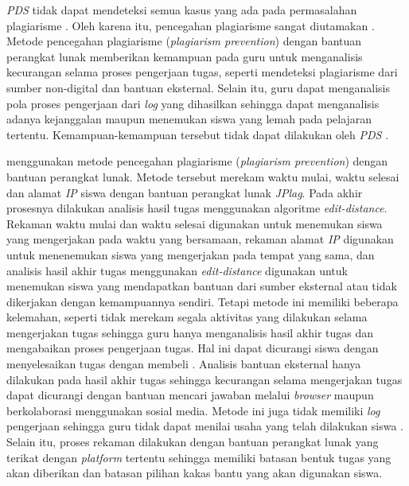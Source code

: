 \emph{PDS} tidak dapat mendeteksi semua kasus yang ada pada
permasalahan plagiarisme \parencite{martins2014plagiarism}. Oleh karena
itu, pencegahan plagiarisme sangat diutamakan
\parencite{garner2012stop}. Metode pencegahan plagiarisme
(\emph{plagiarism prevention}) dengan bantuan perangkat lunak
memberikan kemampuan pada guru untuk menganalisis kecurangan selama
proses pengerjaan tugas, seperti mendeteksi plagiarisme dari sumber
non-digital dan bantuan eksternal. Selain itu, guru dapat menganalisis
pola proses pengerjaan dari \emph{log} yang dihasilkan sehingga dapat
menganalisis adanya kejanggalan maupun menemukan siswa yang lemah pada
pelajaran tertentu. Kemampuan-kemampuan tersebut tidak dapat dilakukan oleh
\emph{PDS} \parencite{hellas2017plagiarism}.

\textcite{hellas2017plagiarism} menggunakan metode pencegahan
plagiarisme (\emph{plagiarism prevention}) dengan bantuan perangkat
lunak. Metode tersebut merekam waktu mulai, waktu selesai dan alamat
\emph{IP} siswa dengan bantuan perangkat lunak \emph{JPlag}. Pada
akhir prosesnya dilakukan analisis hasil tugas menggunakan algoritme
\emph{edit-distance}. Rekaman waktu mulai dan waktu selesai digunakan
untuk menemukan siswa yang mengerjakan pada waktu yang bersamaan,
rekaman alamat \emph{IP} digunakan untuk menenemukan siswa yang
mengerjakan pada tempat yang sama, dan analisis hasil akhir tugas
menggunakan \emph{edit-distance} digunakan untuk menemukan siswa yang
mendapatkan bantuan dari sumber eksternal atau tidak dikerjakan dengan
kemampuannya sendiri. Tetapi metode ini memiliki beberapa kelemahan,
seperti tidak merekam segala aktivitas yang dilakukan selama
mengerjakan tugas sehingga guru hanya menganalisis hasil akhir tugas
dan mengabaikan proses pengerjaan tugas. Hal ini dapat dicurangi siswa
dengan menyelesaikan tugas dengan membeli
\parencite{leung2017instructional}. Analisis bantuan eksternal hanya
dilakukan pada hasil akhir tugas sehingga kecurangan selama
mengerjakan tugas dapat dicurangi dengan bantuan mencari
jawaban melalui \emph{browser} maupun berkolaborasi menggunakan sosial
media. Metode ini juga tidak memiliki \emph{log} pengerjaan sehingga
guru tidak dapat menilai usaha yang telah dilakukan siswa
\parencite{hellas2017plagiarism}. Selain itu, proses rekaman
dilakukan dengan bantuan perangkat lunak yang terikat dengan
\emph{platform} tertentu sehingga memiliki batasan bentuk tugas yang
akan diberikan dan batasan pilihan kakas bantu yang akan digunakan
siswa.

